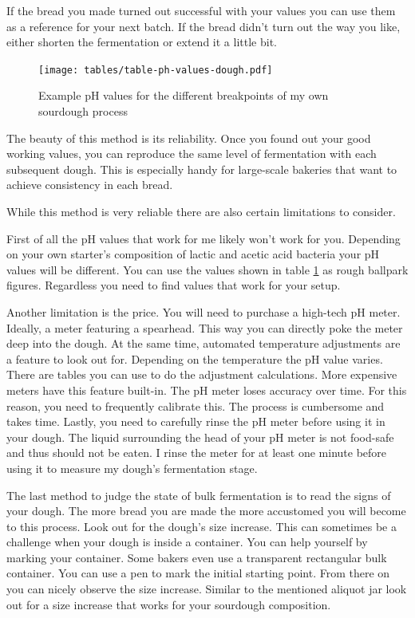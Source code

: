 If the bread you made turned out successful with your values
you can use them as a reference for your next batch. If the
bread didn't turn out the way you like, either shorten
the fermentation or extend it a little bit.

\begin{figure}[!htb]
  \texttt{[image: tables/table-ph-values-dough.pdf]}
  \caption{Example pH values for the different breakpoints of my own sourdough process}
  \label{table:sample-ph-values}
\end{figure}

The beauty of this method is its reliability. Once you found
out your good working values, you can reproduce
the same level of fermentation with each subsequent dough.
This is especially handy for large-scale bakeries that want
to achieve consistency in each bread.

While this method is very reliable there are also certain
limitations to consider.

First of all the pH values that work for me likely won't work for
you. Depending on your own starter's composition of lactic
and acetic acid bacteria your pH values will be different.
You can use the values shown in table \ref{table:sample-ph-values}
as rough ballpark figures. Regardless you need to find values
that work for your setup.

Another limitation is the price. You will need to purchase
a high-tech pH meter. Ideally, a meter featuring a spearhead.
This way you can directly poke the meter deep into the dough.
At the same time, automated temperature adjustments are a
feature to look out for. Depending on the temperature
the pH value varies. There are tables you can use to
do the adjustment calculations. More expensive meters
have this feature built-in. The pH meter loses accuracy
over time. For this reason, you need to frequently
calibrate this. The process is cumbersome and takes time.
Lastly, you need to carefully rinse the pH meter before
using it in your dough. The liquid surrounding the
head of your pH meter is not food-safe and thus should
not be eaten. I rinse the meter for at least one minute
before using it to measure my dough's fermentation stage.

The last method to judge the state of bulk fermentation
is to read the signs of your dough. The more bread you are
made the more accustomed you will become to this process.
Look out for the dough's size increase. This can sometimes
be a challenge when your dough is inside a container.
You can help yourself by marking your container. Some bakers
even use a transparent rectangular bulk container. You
can use a pen to mark the initial starting point. From there
on you can nicely observe the size increase. Similar to the
mentioned aliquot jar look out for a size increase that works
for your sourdough composition.

